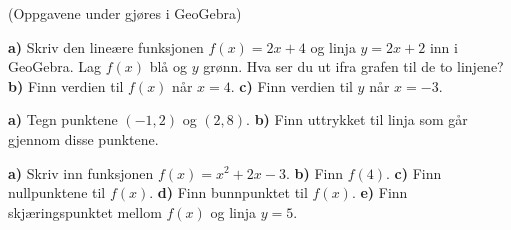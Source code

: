 




\newpage
\nes

(Oppgavene under gjøres i GeoGebra) \vsk

\textbf{a)} Skriv den lineære funksjonen $ {f(x)=2x+4} $ og linja $ {y=2x+2} $ inn i GeoGebra. Lag $ f(x) $ blå og $ y $ grønn. Hva ser du ut ifra grafen til de to linjene?\bs
\textbf{b)} Finn verdien til $ f(x) $ når $ {x=4} $.\bs
\textbf{c)} Finn verdien til $ y $ når $ {x=-3} $.\vsk

\textbf{a)} Tegn punktene $ (-1,2) $ og $ (2,8) $.\bs
\textbf{b)} Finn uttrykket til linja som går gjennom disse punktene.\vsk

\textbf{a)} Skriv inn funksjonen $ {f(x)=x^2+2x-3} $.\bs
\textbf{b)} Finn $ f(4) $.\bs
\textbf{c)} Finn nullpunktene til $ f(x) $.\bs
\textbf{d)} Finn bunnpunktet til $ f(x) $.\bs
\textbf{e)} Finn skjæringspunktet mellom $ f(x) $ og linja $ y=5 $.





